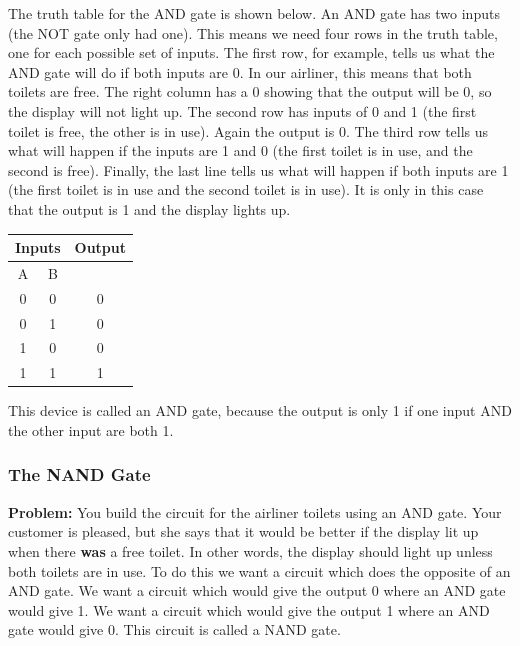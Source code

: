 The truth table for the AND gate is shown below.  An AND gate has two inputs (the NOT gate only had one).  This means we need four rows in the truth table, one for each possible set of inputs.  The first row, for example, tells us what the AND gate will do if both inputs are 0.  In our airliner, this means that both toilets are free.  The right column has a 0 showing that the output will be 0, so the display will not light up.  The second row has inputs of 0 and 1 (the first toilet is free, the other is in use).  Again the output is 0.  The third row tells us what will happen if the inputs are 1 and 0 (the first toilet is in use, and the second is free).  Finally, the last line tells us what will happen if both inputs are 1 (the first toilet is in use and the second toilet is in use).  It is only in this case that the output is 1 and the display lights up.

\begin{center}
\begin{tabular}{|c|c|c|}\hline
\multicolumn{2}{|c|}{\textbf{Inputs}} & \textbf{Output}\\\hline
A&B& \\\hline\hline
0&0&0\\\hline
0&1&0\\\hline
1&0&0\\\hline
1&1&1\\\hline
\end{tabular}
\end{center}

This device is called an AND gate, because the output is only 1 if one input AND the other input are both 1.



\subsubsection{The NAND Gate}
{\bf Problem:} You build the circuit for the airliner toilets using an AND gate.  Your customer is pleased, but she says that it would be better if the display lit up when there {\bf was} a free toilet.  In other words, the display should light up unless both toilets are in use.  To do this we want a circuit which does the opposite of an AND gate.  We want a circuit which would give the output 0 where an AND gate would give 1.  We want a circuit which would give the output 1 where an AND gate would give 0.  This circuit is called a NAND gate.

